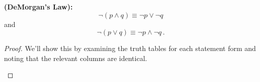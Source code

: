\guard









\begin{prop}
\label{prop:DeMorgans}
    {\bf (DeMorgan's Law):}
    \[ \neg(p\wedge q) \equiv \neg p \vee \neg q \]
    and
    \[ \neg(p\vee q) \equiv \neg p \wedge \neg q\,.\]
\end{prop}
\begin{proof}
  We'll show this by examining the truth tables for each statement form and noting that the relevant columns are identical.
  \begin{center}
    
  \end{center}
\end{proof}

